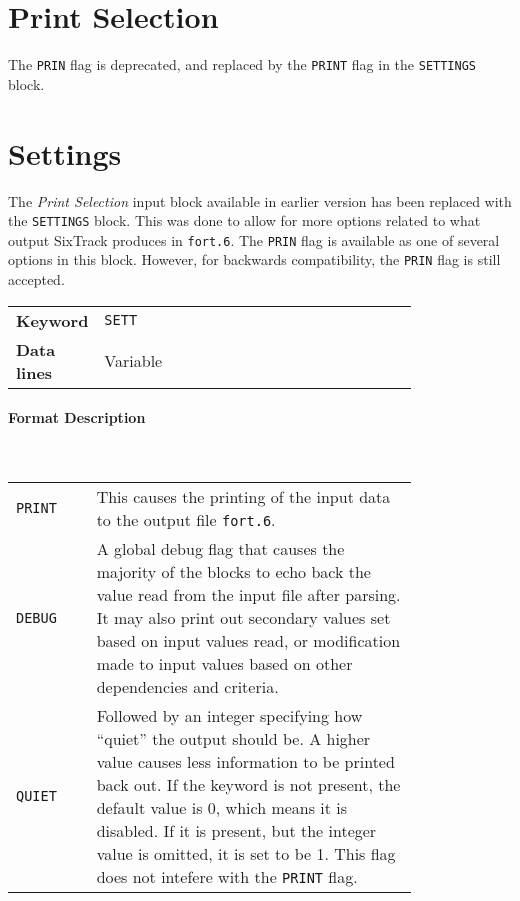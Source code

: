 \section{Print Selection} \label{PriSel}

The \texttt{PRIN} flag is deprecated, and replaced by the \texttt{PRINT} flag in the \texttt{SETTINGS} block.

\section{Settings} \label{STSett}

The \textit{Print Selection} input block available in earlier version has been replaced with the \texttt{SETTINGS} block.
This was done to allow for more options related to what output SixTrack produces in \texttt{fort.6}.
The \texttt{PRIN} flag is available as one of several options in this block.
However, for backwards compatibility, the \texttt{PRIN} flag is still accepted.

\bigskip
\begin{tabular}{@{}lp{0.8\linewidth}}
    \textbf{Keyword}    & \texttt{SETT} \\
    \textbf{Data lines} & Variable
\end{tabular}

\paragraph{Format Description}~

\bigskip
\begin{tabular}{@{}lp{0.8\linewidth}}
    \texttt{PRINT} & This causes the printing of the input data to the output file \texttt{fort.6}. \\
    \texttt{DEBUG} & A global debug flag that causes the majority of the blocks to echo back the value read from the input file after parsing. It may also print out secondary values set based on input values read, or modification made to input values based on other dependencies and criteria.\index{DEBUG}\\
    \texttt{QUIET} & Followed by an integer specifying how ``quiet'' the output should be. A higher value causes less information to be printed back out. If the keyword is not present, the default value is 0, which means it is disabled. If it is present, but the integer value is omitted, it is set to be 1. This flag does not intefere with the \texttt{PRINT} flag.\index{QUIET}
\end{tabular}


